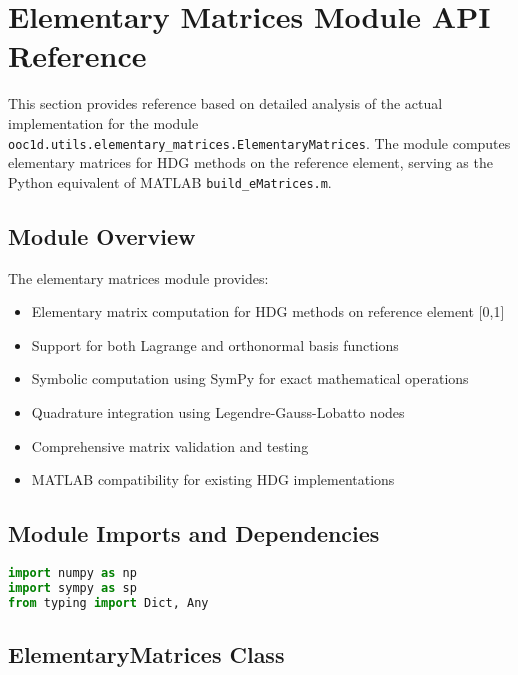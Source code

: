 %

\section{Elementary Matrices Module API Reference}
\label{sec:elementary_matrices_module_api}

This section provides reference  based on detailed analysis of the actual implementation for the  module \texttt{ooc1d.utils.elementary\_matrices.ElementaryMatrices}. The module computes elementary matrices for HDG methods on the reference element, serving as the Python equivalent of MATLAB \texttt{build\_eMatrices.m}.

\subsection{Module Overview}

The elementary matrices module provides:
\begin{itemize}
    \item Elementary matrix computation for HDG methods on reference element [0,1]
    \item Support for both Lagrange and orthonormal basis functions
    \item Symbolic computation using SymPy for exact mathematical operations
    \item Quadrature integration using Legendre-Gauss-Lobatto nodes
    \item Comprehensive matrix validation and testing
    \item MATLAB compatibility for existing HDG implementations
\end{itemize}

\subsection{Module Imports and Dependencies}

\begin{lstlisting}[language=Python, caption=Module Dependencies]
import numpy as np
import sympy as sp
from typing import Dict, Any
\end{lstlisting}

\subsection{ElementaryMatrices Class}
\label{subsec:elementary_matrices_class}

